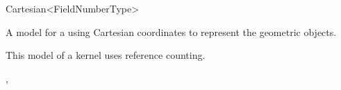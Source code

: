 \begin{ccRefClass}{Cartesian<FieldNumberType>}

\ccDefinition
A model for a  using Cartesian coordinates to represent the
geometric objects.

\ccRefines
{}

\ccTypes
{}
\ccGlue
{}

\ccImplementation
This model of a kernel uses reference counting.

\ccSeeAlso
{}, 
\end{ccRefClass}

